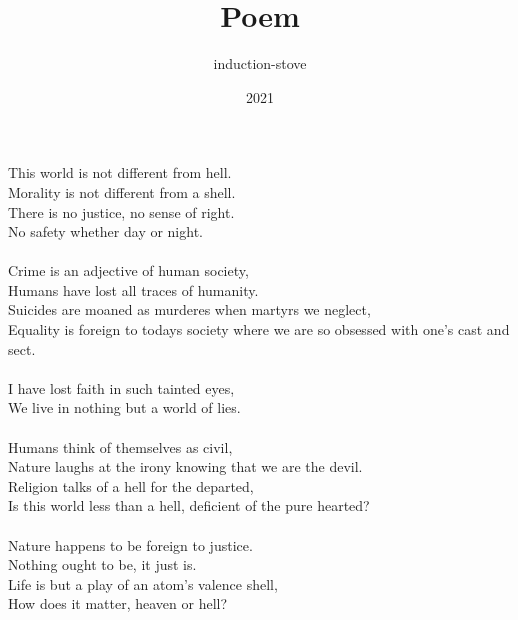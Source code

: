 \documentclass{article}
\title{Poem}
\author{induction-stove}
\date{2021}
\begin{document}
\maketitle
This world is not different from hell.
\\Morality is not different from a shell.
\\There is no justice, no sense of right.
\\No safety whether day or night.
\\\\Crime is an adjective of human society,
\\Humans have lost all traces of humanity.
\\Suicides are moaned as murderes when martyrs we neglect,
\\Equality is foreign to todays society where we are so obsessed with one's cast and sect.
\\\\I have lost faith in such tainted eyes,
\\We live in nothing but a world of lies.
\\\\Humans think of themselves as civil,
\\Nature laughs at the irony knowing that we are the devil.
\\Religion talks of a hell for the departed,
\\Is this world less than a hell, deficient of the pure hearted?
\\\\Nature happens to be foreign to justice.
\\Nothing ought to be, it just is.
\\Life is but a play of an atom's valence shell,
\\How does it matter, heaven or hell?
\end{document}
